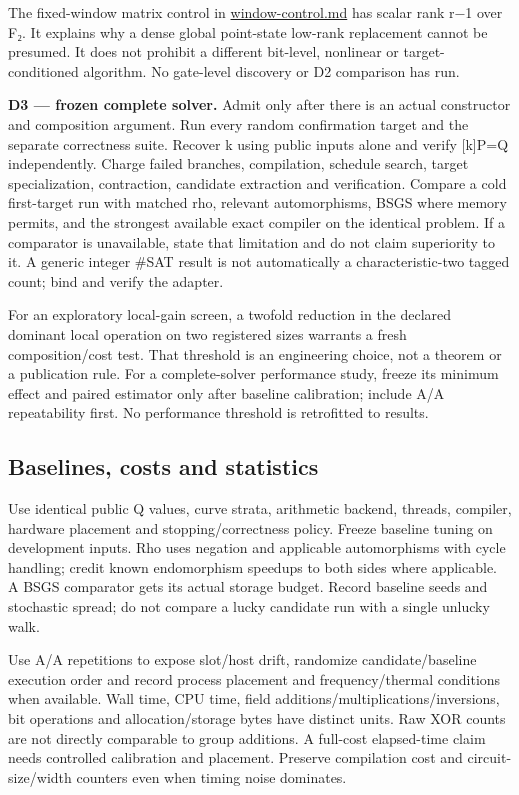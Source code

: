 \documentclass[
  10pt,
]{article}
\begin{document}
The fixed-window matrix control in \url{window-control.md} has scalar
rank r−1 over F₂. It explains why a dense global point-state low-rank
replacement cannot be presumed. It does not prohibit a different
bit-level, nonlinear or target-conditioned algorithm. No gate-level
discovery or D2 comparison has run.

\textbf{D3 --- frozen complete solver.} Admit only after there is an
actual constructor and composition argument. Run every random
confirmation target and the separate correctness suite. Recover k using
public inputs alone and verify {[}k{]}P=Q independently. Charge failed
branches, compilation, schedule search, target specialization,
contraction, candidate extraction and verification. Compare a cold
first-target run with matched rho, relevant automorphisms, BSGS where
memory permits, and the strongest available exact compiler on the
identical problem. If a comparator is unavailable, state that limitation
and do not claim superiority to it. A generic integer \#SAT result is
not automatically a characteristic-two tagged count; bind and verify the
adapter.

For an exploratory local-gain screen, a twofold reduction in the
declared dominant local operation on two registered sizes warrants a
fresh composition/cost test. That threshold is an engineering choice,
not a theorem or a publication rule. For a complete-solver performance
study, freeze its minimum effect and paired estimator only after
baseline calibration; include A/A repeatability first. No performance
threshold is retrofitted to results.

\subsection{Baselines, costs and
statistics}\label{baselines-costs-and-statistics}

Use identical public Q values, curve strata, arithmetic backend,
threads, compiler, hardware placement and stopping/correctness policy.
Freeze baseline tuning on development inputs. Rho uses negation and
applicable automorphisms with cycle handling; credit known endomorphism
speedups to both sides where applicable. A BSGS comparator gets its
actual storage budget. Record baseline seeds and stochastic spread; do
not compare a lucky candidate run with a single unlucky walk.

Use A/A repetitions to expose slot/host drift, randomize
candidate/baseline execution order and record process placement and
frequency/thermal conditions when available. Wall time, CPU time, field
additions/multiplications/inversions, bit operations and
allocation/storage bytes have distinct units. Raw XOR counts are not
directly comparable to group additions. A full-cost elapsed-time claim
needs controlled calibration and placement. Preserve compilation cost
and circuit-size/width counters even when timing noise dominates.
\end{document}
